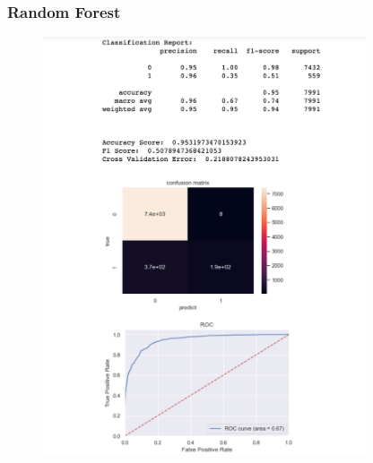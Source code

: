 \documentclass{article}
\begin{document}
\subsubsection{Random Forest}
\begin{figure}[H]
    \centering
    \includegraphics[width=0.85\textwidth]{Fig7}
\end{figure}
\end{document}
